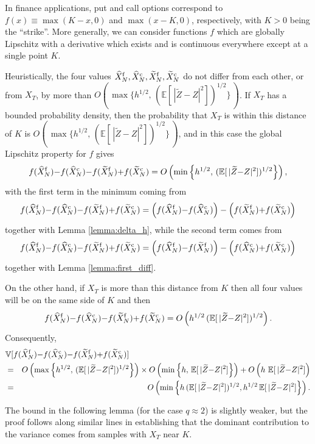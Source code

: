 \documentclass[review]{siamart190516}
\def \EE {{\mathbb{E}}}
\def \VV {{\mathbb{V}}}
\def \tZ {{\widetilde{Z}}}
\def \tXf  {{\widetilde{X}^{\rm f}}}
\def \tXc  {{\widetilde{X}^{\rm c}}}
\def \hXf {{\widehat{X}^{\rm f}}}
\def \hXc {{\widehat{X}^{\rm c}}}
\begin{document}
In finance applications, put and call options correspond to
$f(x)\equiv \max(K{-}x,0)$ and $\max(x{-}K,0)$, respectively,
with $K{>}0$ being the ``strike''. 
More generally, we can consider functions $f$ which are 
globally Lipschitz with a derivative which exists and is 
continuous everywhere except at a single point $K$.

Heuristically, the four values $\hXf_N, \hXc_N, \tXf_N, \tXc_N$ 
do not differ from each other, or from $X_T$, by more than 
$O(\, \max\{ h^{1/2}, \, (\EE[\, |\tZ{-}Z|^2])^{1/2}\}\, )$.
If $X_T$ has a bounded probability density, then the 
probability that $X_T$ is within this distance of $K$
is $O(\, \max\{ h^{1/2}, \, (\EE[\, |\tZ{-}Z|^2])^{1/2}\}\, )$, 
and in this case the global Lipschitz property for $f$ gives
\[
f(\hXf_N) {-} f(\hXc_N) {-} f(\tXf_N) {+} f(\tXc_N)
= O\left( \min\left\{ h^{1/2}, \, (\EE[\, |\tZ{-}Z|^2])^{1/2} \right\} \right),
\]
with the first term in the minimum coming from 
\[
f(\hXf_N) {-} f(\hXc_N) {-} f(\tXf_N) {+} f(\tXc_N)
= \left( f(\hXf_N) {-} f(\hXc_N) \right) - \left(f(\tXf_N) {+} f(\tXc_N)\right)
\]
together with Lemma \ref{lemma:delta_h}, while the second term comes from
\[
f(\hXf_N) {-} f(\hXc_N) {-} f(\tXf_N) {+} f(\tXc_N)
= \left( f(\hXf_N) {-} f(\tXf_N) \right) - \left(f(\hXc_N) {+} f(\tXc_N)\right)
\]
together with Lemma \ref{lemma:first_diff}.

On the other hand, if $X_T$ is more than this distance from $K$ 
then all four values will be on the same side of $K$ and then
\[
f(\hXf_N) {-} f(\hXc_N) {-} f(\tXf_N) {+} f(\tXc_N)
= O\left( h^{1/2}\, (\EE[\, |\tZ{-}Z|^2])^{1/2} \right).
\]
Consequently,
\begin{eqnarray*}
\lefteqn{
\VV[f(\hXf_N) {-} f(\hXc_N) {-} f(\tXf_N) {+} f(\tXc_N)] 
}
\\ &=& O\left(\max\left\{ h^{1/2},\, (\EE[\, |\tZ{-}Z|^2])^{1/2}\right\} \right)
 \times O\left( \min\left\{ h,\, \EE[\, |\tZ{-}Z|^2] \right\} \right)
 + O\left( h \ \EE[\, |\tZ{-}Z|^2] \right)
\\ &=& O\left( \min\left\{ h\, (\EE[\, |\tZ{-}Z|^2])^{1/2},
                       h^{1/2}\, \EE[\, |\tZ{-}Z|^2] \right\} \right).
\end{eqnarray*}

The bound in the following lemma (for the case $q{\approx}2$) is
slightly weaker, but the proof follows along similar lines in
establishing that the dominant contribution to the variance comes
from samples with $X_T$ near $K$.
\end{document}
